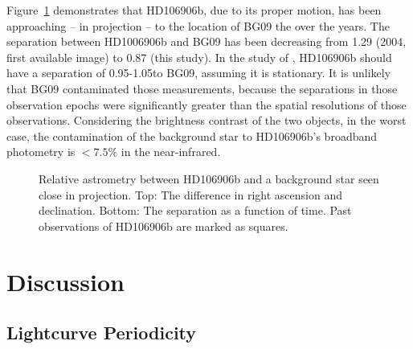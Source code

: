 \documentclass[twocolumn]{aastex62}
\begin{document}
Figure~\ref{fig:astrometry:bck} demonstrates that HD106906b, due to its proper motion, has been approaching  -- in projection -- to {the location of BG09} the  over the years. The separation between HD1006906b and {BG09} has been decreasing from 1\arcsec.29 (2004, first available image) to 0\arcsec.87 (this study). In the study of \citep{Bailey2013, Wu2016, Daemgen2017},  HD106906b should have a separation of 0.95\arcsec{}-1.05\arcsec to {BG09}, assuming it is stationary. It is unlikely that {BG09} contaminated those measurements, because the separations in those observation epochs were significantly greater than the spatial resolutions of those observations. Considering the brightness contrast of the two objects, in the worst case, the contamination of the background star to HD106906b's broadband photometry is  $<7.5\%$ in the near-infrared. 

\begin{figure}[!ht]
  \centering
  \caption{Relative astrometry between HD106906b and a background star seen close in projection. Top: The difference in right ascension and declination. Bottom: The separation as a function of time. Past observations of HD106906b are marked as squares.}
  \label{fig:astrometry:bck}
\end{figure}






\section{Discussion}
\subsection{Lightcurve Periodicity}
\end{document}
